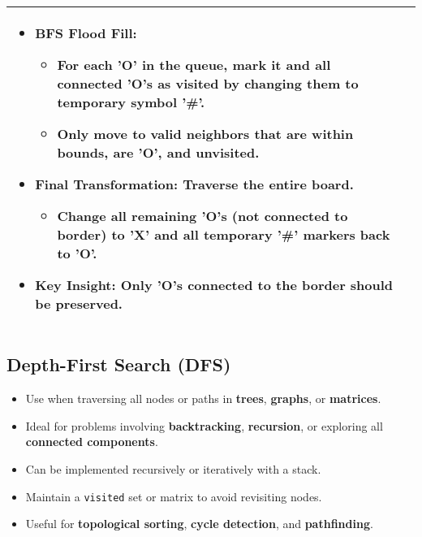 \begin{summary}
\begin{center}
\begin{tabular}{ll}
{\begin{itemize}
                    \item \textbf{BFS Flood Fill:}
                    \begin{itemize}
                        \item For each 'O' in the queue, mark it and all connected 'O's as visited by changing them to temporary symbol '\#'.
                        \item Only move to valid neighbors that are within bounds, are 'O', and unvisited.
                    \end{itemize}
                
                    \item \textbf{Final Transformation:} Traverse the entire board.
                    \begin{itemize}
                        \item Change all remaining 'O's (not connected to border) to 'X' and all temporary '\#' markers back to 'O'.
                    \end{itemize}
                
                    \item \textbf{Key Insight:} Only 'O's connected to the border should be preserved. 
                \end{itemize}                             
            } \\
            \bottomrule
        \end{tabular}
    \end{center}
\end{summary}
\newpage

\subsection{Depth-First Search (DFS)}

\begin{summary}
    \begin{itemize}
        \item Use when traversing all nodes or paths in \textbf{trees}, \textbf{graphs}, or \textbf{matrices}.
        \item Ideal for problems involving \textbf{backtracking}, \textbf{recursion}, or exploring all \textbf{connected components}.
        \item Can be implemented recursively or iteratively with a stack.
        \item Maintain a \texttt{visited} set or matrix to avoid revisiting nodes.
        \item Useful for \textbf{topological sorting}, \textbf{cycle detection}, and \textbf{pathfinding}.
    \end{itemize}
\end{summary}

